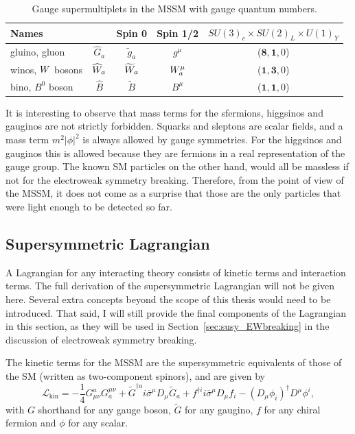 \begin{table}[t]
  \caption{Gauge supermultiplets in the MSSM with gauge quantum numbers. }
  \begin{center}
  \begin{tabular}{ l c | c c c }
    \toprule
    \multicolumn{2}{l}{Names} & Spin 0 & Spin 1/2 & $SU(3)_c \times SU(2)_L \times U(1)_Y$ \\ 
    \midrule
    gluino, gluon & $\widehat{G}_a$ & $\widetilde{g}_a$ & $g^\mu$ & ($\mathbf{8}, \mathbf{1}, 0$)
\\[1ex]
    winos, $W$ bosons & $\widehat{W}_a$ & $\widetilde{W}_a$ & $W_a^\mu$ &
($\mathbf{1}, \mathbf{3}, 0$)  \\[1ex]
    bino, $B^0$ boson & $\widehat{B}$ & $\widetilde{B}$ & $B^\mu$ & ($\mathbf{1}, \mathbf{1}, 0$) \\
    \bottomrule
  \end{tabular}
  \end{center}
  \label{tab:gauge_multiplets}
\end{table}

It is interesting to observe that mass terms for the sfermions, higgsinos and gauginos are not
strictly forbidden. Squarks and sleptons are scalar fields, and a mass term $m^2|\phi|^2$ is always
allowed by gauge symmetries. For the higgsinos and gauginos this is allowed because they are
fermions in a real representation of the gauge group. 
The known SM particles on the other hand, would all be massless if not for the electroweak symmetry
breaking. Therefore, from the point of view of the MSSM, it does not come as a surprise that those
are the only particles that were light enough to be detected so far.  

\subsection{Supersymmetric Lagrangian \label{sec:susy_lagrangian}}

A Lagrangian for any interacting theory consists of kinetic terms and interaction terms. 
The full derivation of the supersymmetric Lagrangian will not be given here. Several extra concepts
beyond the scope of this thesis would need to be introduced. That said, I will still provide the
final components of the Lagrangian in this section, as they will be used in
Section~\ref{sec:susy_EWbreaking} in the discussion of electroweak symmetry breaking. 

The kinetic terms for the MSSM are the supersymmetric equivalents of those of the SM (written as
two-component spinors), and are given by
\begin{equation}
  \mathcal{L}_{\text{kin}} = - \frac{1}{4} G_{\mu\nu}^a G_a^{\mu\nu} + \widetilde{G}^{\dagger a} i
\overline{\sigma}^\mu D_\mu \widetilde{G}_a 
   + f^{\dagger i} i \overline{\sigma}^\mu D_\mu f_i - (D_\mu \phi_i)^\dagger D^\mu \phi^i,
\end{equation}
with $G$ shorthand for any gauge boson, $\widetilde{G}$ for any gaugino, $f$ for any chiral fermion
and $\phi$ for any scalar. 


